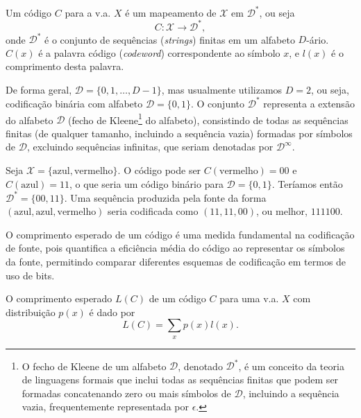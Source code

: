 \begin{definition}
Um código $C$ para a v.a. $X$ é um mapeamento de $\mathcal{X}$ em $\mathcal{D}^\ast$,
ou seja
\begin{equation}
  C: \mathcal{X} \rightarrow \mathcal{D}^\ast ,
\end{equation}
onde $\mathcal{D}^\ast$ é o conjunto
de sequências (\textit{strings}) finitas em um alfabeto $D$-ário. $C(x)$ é a palavra código
(\textit{codeword}) correspondente ao símbolo $x$, e $l(x)$ é o comprimento desta palavra.
\end{definition}
De forma geral, $\mathcal{D} = \{0,1, \ldots, D-1\}$, mas usualmente utilizamos $D=2$, ou seja,
codificação binária com alfabeto $\mathcal{D} = \{0,1\}$.
O conjunto $\mathcal{D}^\ast$ representa a extensão do alfabeto $\mathcal{D}$
(fecho de Kleene\footnote{
  O fecho de Kleene de um alfabeto $\mathcal{D}$, denotado $\mathcal{D}^\ast$,
  é um conceito da teoria de linguagens formais que inclui todas as sequências
  finitas que podem ser formadas concatenando zero ou mais símbolos de $\mathcal{D}$,
  incluindo a sequência vazia, frequentemente representada por $\epsilon$.

} do alfabeto), consistindo de todas as sequências finitas (de qualquer tamanho,
incluindo a sequência vazia) formadas por símbolos de $\mathcal{D}$, excluindo
sequências infinitas, que seriam denotadas por $\mathcal{D}^\infty$.

\begin{example}
Seja $\mathcal{X} = \{\text{azul}, \text{vermelho}\}$. O código pode ser $C(\text{vermelho})=00$ e
$C(\text{azul})=11$, o que seria um código binário para $\mathcal{D} = \{0,1\}$.
Teríamos então $\mathcal{D}^\ast = \{ 00 , 11 \}$. Uma sequência produzida pela fonte da forma
$(\text{azul},\text{azul},\text{vermelho})$ seria codificada como $(11,11,00)$, ou melhor, $111100$.
\end{example}

O comprimento esperado de um código é uma medida fundamental na codificação de
fonte, pois quantifica a eficiência média do código ao representar os símbolos
da fonte, permitindo comparar diferentes esquemas de codificação em termos de
uso de bits.

\begin{definition}
O comprimento esperado $L(C)$ de um código $C$ para uma v.a. $X$ com distribuição $p(x)$ é dado por
\begin{equation}
  L(C) = \sum_x p(x) l(x) .
\end{equation}
\end{definition}


